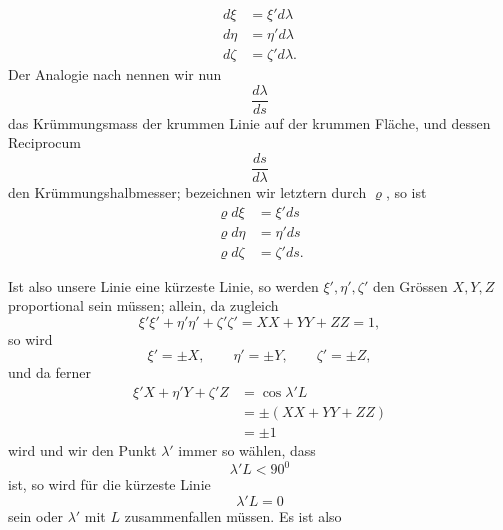 %
\[
\begin{aligned}
d\xi&=\xi'd\lambda\\
d\eta&=\eta'd\lambda\\
d\zeta&=\zeta'd\lambda.
\end{aligned}
\]
Der Analogie nach nennen wir nun
\[
\frac{d\lambda}{ds}
\]
das Krümmungsmass der krummen Linie auf der krummen Fläche, und dessen Reciprocum
\[
\frac{ds}{d\lambda}
\]
den Krümmungshalbmesser; bezeichnen wir letztern durch $\varrho$, so ist
\[
\begin{aligned}
\varrho d\xi&=\xi'ds\\
\varrho d\eta&=\eta'ds\\
\varrho d\zeta&=\zeta'ds.
\end{aligned}
\]

Ist also unsere Linie eine kürzeste Linie, so werden $\xi',\eta',\zeta'$ den Grössen $X,Y,Z$ proportional sein müssen; allein, da zugleich
\[
\xi'\xi'+\eta'\eta'+\zeta'\zeta'=XX+YY+ZZ=1,
\]
so wird
\[
\xi'=\pm X,\qquad\eta'=\pm Y,\qquad\zeta'=\pm Z,
\]
und da ferner
\[
\begin{aligned}
\xi'X+\eta'Y+\zeta'Z&=\cos\lambda'L\\
&=\pm(XX+YY+ZZ)\\
&=\pm1
\end{aligned}
\]
wird und wir den Punkt $\lambda'$ immer so wählen, dass
\[
\lambda'L<90^{0}
\]
ist, so wird für die kürzeste Linie
\[
\lambda'L=0
\]
sein oder $\lambda'$ mit $L$ zusammenfallen müssen. Es ist also
